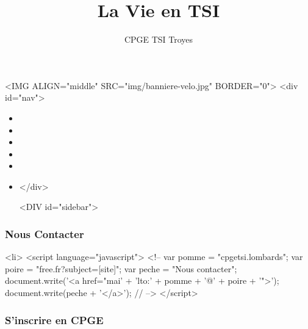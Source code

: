 \documentclass{article}
\title{La Vie en TSI}
\begin{document}
\date{CPGE TSI Troyes}
\maketitle
\clearpage

<IMG ALIGN="middle" SRC="img/banniere-velo.jpg" BORDER="0">
<div id="nav">

\begin{itemize}
\item {}
\item {}
\item {}
\item {}
\item {}
\item {}
</div>

<DIV id="sidebar">

\end{itemize}

\subsubsection*{Nous Contacter}

\begin{compactitem}
\item {}
<li>
<script language="javascript">
<!--
var pomme = "cpgetsi.lombards";
var poire = "free.fr?subject=[site]";
var peche = "Nous contacter";
document.write('<a href="mai' + 'lto:' + pomme + '@' + poire + '">');
document.write(peche + '</a>');
// -->
</script>
\end{compactitem}

\subsubsection*{S'inscrire en CPGE}

\begin{compactitem}
\item {}
\item {}
\item {}
\end{compactitem}
\end{document}
